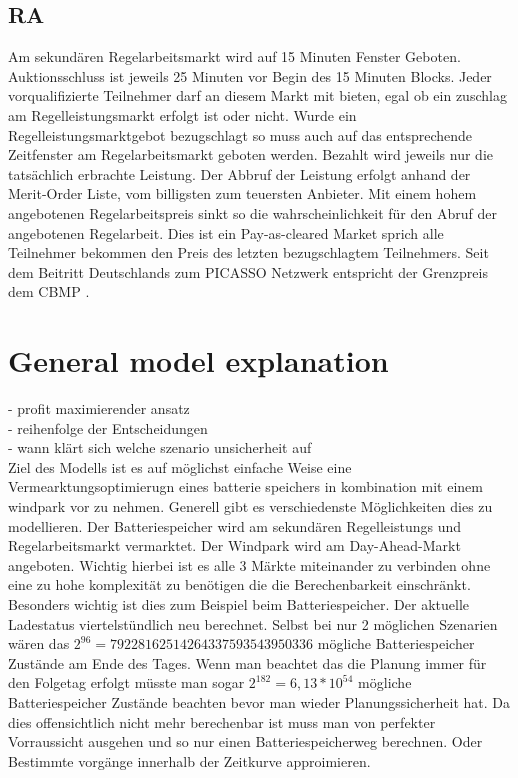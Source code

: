 \subsection{RA}
Am sekundären Regelarbeitsmarkt wird auf 15 Minuten Fenster Geboten. Auktionsschluss ist jeweils 25 Minuten vor Begin des 15 Minuten Blocks.
Jeder vorqualifizierte Teilnehmer darf an diesem Markt mit bieten, egal ob ein zuschlag am Regelleistungsmarkt erfolgt ist oder nicht.
Wurde ein Regelleistungsmarktgebot bezugschlagt so muss auch auf das entsprechende Zeitfenster am Regelarbeitsmarkt geboten werden.
Bezahlt wird jeweils nur die tatsächlich erbrachte Leistung. Der Abbruf der Leistung erfolgt anhand der Merit-Order Liste, vom billigsten zum teuersten Anbieter.
Mit einem hohem angebotenen Regelarbeitspreis sinkt so die wahrscheinlichkeit für den Abruf der angebotenen Regelarbeit.
Dies ist ein Pay-as-cleared Market sprich alle Teilnehmer bekommen den Preis des letzten bezugschlagtem Teilnehmers.
Seit dem Beitritt Deutschlands zum PICASSO Netzwerk entspricht der Grenzpreis dem CBMP \cite{50hertzamprionTENNETTRANSNETBW.}.

\section{General model explanation}

- profit maximierender ansatz\\
- reihenfolge der Entscheidungen\\
- wann klärt sich welche szenario unsicherheit auf\\

Ziel des Modells ist es auf möglichst einfache Weise eine Vermearktungsoptimierugn eines batterie speichers in kombination mit einem windpark vor zu nehmen.
Generell gibt es verschiedenste Möglichkeiten dies zu modellieren. Der Batteriespeicher wird am sekundären Regelleistungs und Regelarbeitsmarkt vermarktet.
Der Windpark wird am Day-Ahead-Markt angeboten. Wichtig hierbei ist es alle 3 Märkte miteinander zu verbinden ohne eine zu hohe komplexität zu benötigen die die Berechenbarkeit einschränkt.
Besonders wichtig ist dies zum Beispiel beim Batteriespeicher. Der aktuelle Ladestatus viertelstündlich neu berechnet. Selbst bei nur 2 möglichen Szenarien
wären das $ 2^{96} = 79228162514264337593543950336$ mögliche Batteriespeicher Zustände am Ende des Tages. Wenn man beachtet das die Planung immer für den Folgetag erfolgt
müsste man sogar $2^{182} = 6,13* 10^{54}$ mögliche Batteriespeicher Zustände beachten bevor man wieder Planungssicherheit hat.
Da dies offensichtlich nicht mehr berechenbar ist muss man von perfekter Vorraussicht ausgehen und so nur einen Batteriespeicherweg berechnen.
Oder Bestimmte vorgänge innerhalb der Zeitkurve approimieren.

